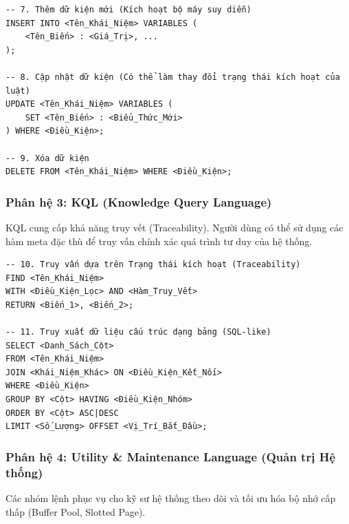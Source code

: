 \documentclass[13pt,a4paper,oneside]{extreport}
\begin{document}
\begin{academicbox}
\begin{Verbatim}[commandchars=\\\{\},breaklines=true,breakanywhere=true,fontfamily=tt,fontsize=\small]
-- 7. Thêm dữ kiện mới (Kích hoạt bộ máy suy diễn)
INSERT INTO <Tên_Khái_Niệm> VARIABLES ( 
    <Tên_Biến> : <Giá_Trị>, ... 
);

-- 8. Cập nhật dữ kiện (Có thể làm thay đổi trạng thái kích hoạt của luật)
UPDATE <Tên_Khái_Niệm> VARIABLES ( 
    SET <Tên_Biến> : <Biểu_Thức_Mới> 
) WHERE <Điều_Kiện>;

-- 9. Xóa dữ kiện
DELETE FROM <Tên_Khái_Niệm> WHERE <Điều_Kiện>;
\end{Verbatim}
\end{academicbox}




\subsubsection{Phân hệ 3: KQL (Knowledge Query Language)}

KQL cung cấp khả năng truy vết (Traceability). Người dùng có thể sử dụng các hàm meta đặc thù để truy vấn chính xác quá trình tư duy của hệ thống.


\begin{academicbox}
\begin{Verbatim}[commandchars=\\\{\},breaklines=true,breakanywhere=true,fontfamily=tt,fontsize=\small]
-- 10. Truy vấn dựa trên Trạng thái kích hoạt (Traceability)
FIND <Tên_Khái_Niệm> 
WITH <Điều_Kiện_Lọc> AND <Hàm_Truy_Vết>
RETURN <Biến_1>, <Biến_2>;

-- 11. Truy xuất dữ liệu cấu trúc dạng bảng (SQL-like)
SELECT <Danh_Sách_Cột> 
FROM <Tên_Khái_Niệm> 
JOIN <Khái_Niệm_Khác> ON <Điều_Kiện_Kết_Nối>
WHERE <Điều_Kiện> 
GROUP BY <Cột> HAVING <Điều_Kiện_Nhóm>
ORDER BY <Cột> ASC|DESC 
LIMIT <Số_Lượng> OFFSET <Vị_Trí_Bắt_Đầu>;
\end{Verbatim}
\end{academicbox}




\subsubsection{Phân hệ 4: Utility \& Maintenance Language (Quản trị Hệ thống)}

Các nhóm lệnh phục vụ cho kỹ sư hệ thống theo dõi và tối ưu hóa bộ nhớ cấp thấp (Buffer Pool, Slotted Page).
\end{document}

